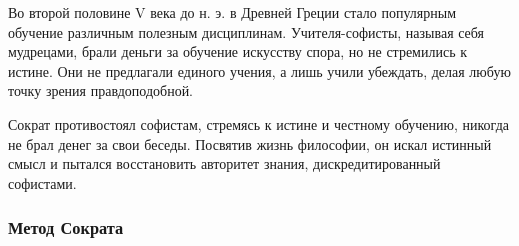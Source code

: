 Во второй половине V века до н. э. в Древней Греции стало популярным обучение различным полезным дисциплинам. Учителя-софисты, называя себя мудрецами, брали деньги за обучение искусству спора, но не стремились к истине. Они не предлагали единого учения, а лишь учили убеждать, делая любую точку зрения правдоподобной.



Сократ противостоял софистам, стремясь к истине и честному обучению, никогда не брал денег за свои беседы. Посвятив жизнь философии, он искал истинный смысл и пытался восстановить авторитет знания, дискредитированный софистами.

\subsubsection{Метод Сократа}



